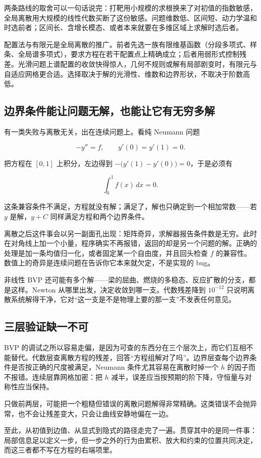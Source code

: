 两条路线的取舍可以一句话说完：打靶用小规模的求根换来了对初值的指数敏感，全局离散用大规模的线性代数买断了这份敏感。问题维数低、区间短、动力学温和时选前者；区间长、含增长模态、或者本来就要在多维区域上求解时选后者。

配置法与有限元是全局离散的推广。前者先选一族有限维基函数（分段多项式、样条、全局谱多项式），要求方程在若干配置点上精确成立；后者用弱形式控制残差。光滑问题上谱配置的收敛快得惊人，几何不规则或解有局部剧变时，有限元与自适应网格更合适。选择取决于解的光滑性、维数和边界形状，不取决于阶数高低。

\subsection{边界条件能让问题无解，也能让它有无穷多解}

有一类失败与离散无关，出在连续问题上。看纯 Neumann 问题

\[
-y''=f,\qquad y'(0)=y'(1)=0 .
\]

把方程在 \([0,1]\) 上积分，左边得到 \(-\bigl(y'(1)-y'(0)\bigr)=0\)，于是必须有

\[
\int_0^1 f(x)\,dx=0 .
\]

这条兼容条件不满足，方程就没有解；满足了，解也只确定到一个相加常数——若 \(y\) 是解，\(y+C\) 同样满足方程和两个边界条件。

离散之后这件事会以另一副面孔出现：矩阵奇异，求解器报告条件数是无穷。此时在对角线上加一个小量，程序确实不再报错，返回的却是另一个问题的解。正确的处理是加一条均值归一化，或者固定某一个自由度，并且回头检查 \(f\) 的兼容性。数值上的奇异是连续问题在告诉你它本来就欠定，不是实现的 bug。

非线性 BVP 还可能有多个解——梁的屈曲、燃烧的多稳态、反应扩散的分支，都是这样。Newton 从哪里出发，决定收敛到哪一支。代数残差降到 \(10^{-12}\) 只说明离散系统解得干净，它对``这一支是不是物理上要的那一支''不发表任何意见。

\subsection{三层验证缺一不可}

BVP 的调试之所以容易走偏，是因为可查的东西分在三个层次上，而它们互相不能替代。代数层查离散方程的残差，回答``方程组解对了吗''。边界层查每个边界条件是否按正确的尺度被满足，Neumann 条件尤其容易在离散时掉一个 \(h\) 的因子而不报错。连续层靠网格加密：把 \(h\) 减半，误差应当按预期的阶下降，守恒量与对称性应当保持。

只做前两层，可能把一个粗糙但错误的离散问题解得非常精确。这类错误不会抛异常，也不会让残差变大，只会让曲线安静地偏在一边。

至此，从初值到边值、从显式到隐式的路径走完了一遍。贯穿其中的是同一件事：局部信息足以定义一步，但一步之外的行为由累积、放大和约束的位置共同决定，而这三者都不写在方程的右端项里。
